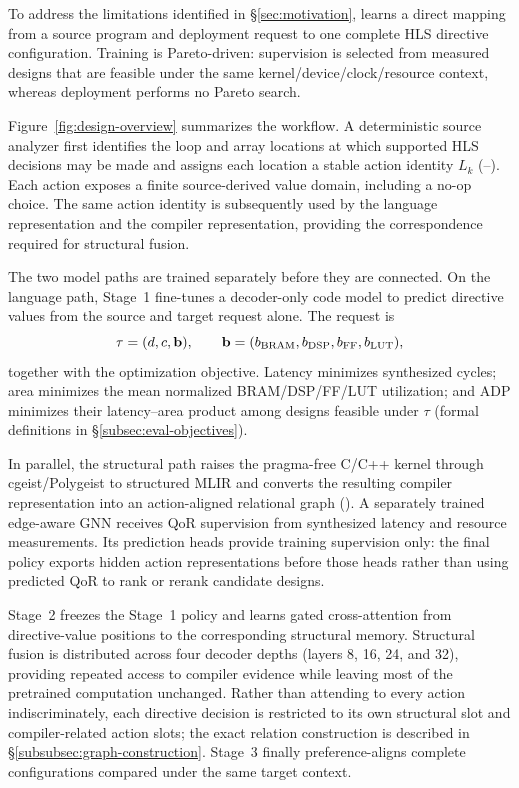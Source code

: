 
To address the limitations identified in
\S\ref{sec:motivation}, \framework learns a direct mapping from a
source program and deployment request to one complete HLS directive
configuration. Training is Pareto-driven: supervision is selected from
measured designs that are feasible under the same
kernel/device/clock/resource context, whereas deployment performs no
Pareto search.

Figure~\ref{fig:design-overview} summarizes the workflow. A deterministic
source analyzer first identifies the loop and array locations at which
supported HLS decisions may be made and assigns each location a stable
action identity $L_k$ (--). Each action exposes a
finite source-derived value domain, including a no-op choice. The same
action identity is subsequently used by the language representation and
the compiler representation, providing the correspondence required for
structural fusion.

The two model paths are trained separately before they are connected.
On the language path, Stage~1 fine-tunes a decoder-only code model to
predict directive values from the source and target request alone. The
request is
%
\[
\tau=(d,c,\mathbf b),\qquad
\mathbf b=(b_{\rm BRAM},b_{\rm DSP},b_{\rm FF},b_{\rm LUT}),
\]
%
together with the optimization objective. Latency minimizes synthesized
cycles; area minimizes the mean normalized BRAM/DSP/FF/LUT utilization;
and ADP minimizes their latency--area product among designs feasible
under $\tau$ (formal definitions in \S\ref{subsec:eval-objectives}).

In parallel, the structural path raises the pragma-free C/C++ kernel
through cgeist/Polygeist to structured MLIR and converts the resulting
compiler representation into an action-aligned relational graph
(). A separately trained edge-aware GNN receives QoR
supervision from synthesized latency and resource measurements. Its
prediction heads provide training supervision only: the final policy
exports hidden action representations before those heads rather than
using predicted QoR to rank or rerank candidate designs.

Stage~2 freezes the Stage~1 policy and learns gated cross-attention from
directive-value positions to the corresponding structural memory.
Structural fusion is distributed across four decoder depths
(layers 8, 16, 24, and 32), providing repeated access to compiler evidence
while leaving most of the pretrained computation unchanged. Rather than
attending to every action indiscriminately, each directive decision is
restricted to its own structural slot and compiler-related action slots;
the exact relation construction is described in
\S\ref{subsubsec:graph-construction}. Stage~3 finally preference-aligns
complete configurations compared under the same target context.

